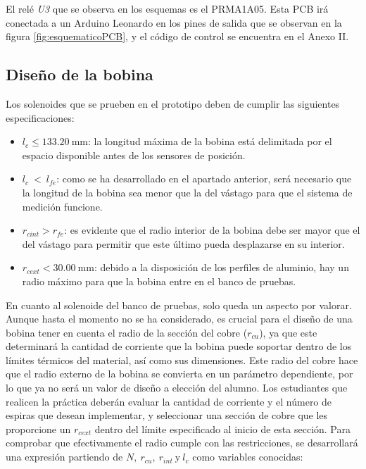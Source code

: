 El relé \textit{U3} que se observa en los esquemas es el PRMA1A05. Esta PCB irá conectada a un Arduino Leonardo en los pines de salida que se observan en la figura \ref{fig:esquematicoPCB}, y el código de control se encuentra en el Anexo II.

\subsection{Diseño de la bobina}
\label{subsec:bobina}

Los solenoides que se prueben en el prototipo deben de cumplir las siguientes especificaciones:

\begin{itemize}
    \item \(l_{c} \leq 133.20~\text{mm}\): la longitud máxima de la bobina está delimitada por el espacio disponible antes de los sensores de posición.
    \item \(l_c~<~l_{fe}\): como se ha desarrollado en el apartado anterior, será necesario que la longitud de la bobina sea menor que la del vástago para que el sistema de medición funcione.
    \item \(r_{cint} > r_{fe}\): es evidente que el radio interior de la bobina debe ser mayor que el del vástago para permitir que este último pueda desplazarse en su interior.
    \item \(r_{cext} < 30.00~\text{mm}\): debido a la disposición de los perfiles de aluminio, hay un radio máximo para que la bobina entre en el banco de pruebas.
\end{itemize}

En cuanto al solenoide del banco de pruebas, solo queda un aspecto por valorar. Aunque hasta el momento no se ha considerado, es crucial para el diseño de una bobina tener en cuenta el radio de la sección del cobre (\(r_{cu}\)), ya que este determinará la cantidad de corriente que la bobina puede soportar dentro de los límites térmicos del material, así como sus dimensiones. Este radio del cobre hace que el radio externo de la bobina se convierta en un parámetro dependiente, por lo que ya no será un valor de diseño a elección del alumno. Los estudiantes que realicen la práctica deberán evaluar la cantidad de corriente y el número de espiras que desean implementar, y seleccionar una sección de cobre que les proporcione un \(r_{cext}\) dentro del límite especificado al inicio de esta sección. Para comprobar que efectivamente el radio cumple con las restricciones, se desarrollará una expresión partiendo de \(N,~r_{cu},~r_{int}~\text{y}~l_c\) como variables conocidas:

